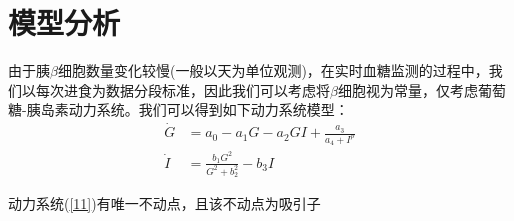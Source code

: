\section{模型分析}

由于胰$\beta$细胞数量变化较慢(一般以天为单位观测)，在实时血糖监测的过程中，我们以每次进食为数据分段标准，因此我们可以考虑将$\beta$细胞视为常量，仅考虑葡萄糖-胰岛素动力系统\cite{huard2022mathematical}。我们可以得到如下动力系统模型：
\begin{equation}\label{11}
    \begin{aligned}
        \dot{G} & = a_0-a_1G-a_2GI+\frac{a_3}{a_4+I^p}  \\
        \dot{I} & = \frac{b_1 G^2}{G^2 + b_2^2} - b_3 I
    \end{aligned}
\end{equation}
\begin{prop}
    动力系统(\ref{11})有唯一不动点，且该不动点为吸引子
\end{prop}

